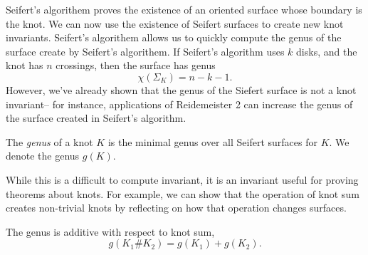 Seifert's algorithem proves the existence of an oriented surface whose boundary is the knot. We can now use the existence of Seifert surfaces to create new knot invariants. Seifert's algorithem allows us to quickly compute the genus of the surface create by Seifert's algorithem. If Seifert's algorithm uses $k$ disks, and the knot has $n$ crossings, then the surface has genus 
\[\chi(\Sigma_K)=n-k-1.\]
However, we've already shown that the genus of the Siefert surface is not a knot invariant-- for instance, applications of Reidemeister 2 can increase the genus of the surface created in Seifert's algorithm. 
\begin{definition}
The \emph{genus} of a knot $K$ is the minimal genus over all Seifert surfaces for $K$. We denote the genus $g(K)$. 
\end{definition}
While this is a difficult to compute invariant, it is an invariant useful for proving theorems about knots. For example, we can show that the operation of knot sum creates non-trivial knots by reflecting on how that operation changes surfaces. 
\begin{theorem}
The genus is additive with respect to knot sum,
\[g(K_1\#K_2)=g(K_1)+g(K_2).\]
\end{theorem}
